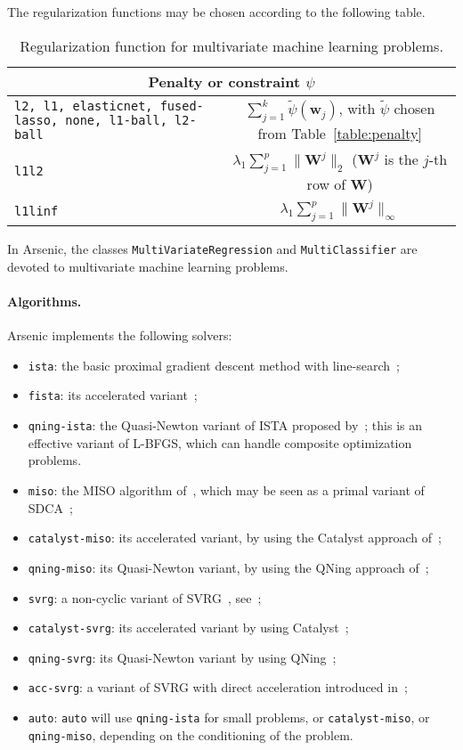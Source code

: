 \documentclass{article}
\def\w{{\mathbf{w}}}
\def\W{{\mathbf{W}}}
\begin{document}
The regularization functions may be chosen according to the following table.
\begin{table}[h!]
   \centering
   \begin{tabular}{|p{5cm}|c|}
      \hline
      \multicolumn{2}{|c|}{Penalty or constraint $\psi$}     \\  
      \hline
      \texttt{l2, l1, elasticnet, fused-lasso, none, l1-ball, l2-ball} & 
      $\sum_{j=1}^k \tilde{\psi}(\w_j)$, with $\tilde{\psi}$ chosen from Table~\ref{table:penalty} \\
      \hline
      \texttt{l1l2} & $\lambda_1 \sum_{j=1}^p \| \W^j\|_2$ ($\W^j$ is the $j$-th row of $\W$) \\ 
      \hline
      \texttt{l1linf} & $\lambda_1 \sum_{j=1}^p \| \W^j\|_\infty$  \\ 
      \hline
   \end{tabular}
   \caption{Regularization function for multivariate machine learning problems.}
\end{table}

In Arsenic, the classes \texttt{MultiVariateRegression} and \texttt{MultiClassifier} are devoted to multivariate machine learning problems.

\paragraph{Algorithms.}
Arsenic implements the following solvers:
\begin{itemize}
   \item \texttt{ista}: the basic proximal gradient descent method with line-search~\citep[see][]{fista};
   \item \texttt{fista}: its accelerated variant~\citep{fista};
   \item \texttt{qning-ista}: the Quasi-Newton variant of ISTA proposed by~\citet{lin2019inexact}; this is an effective variant of L-BFGS, which can handle composite optimization problems.
   \item \texttt{miso}: the MISO algorithm of~\citet{miso}, which may be seen as a primal variant of SDCA~\citep{sdca};
   \item \texttt{catalyst-miso}: its accelerated variant, by using the Catalyst approach of~\citet{lin2018catalyst};
   \item \texttt{qning-miso}: its Quasi-Newton variant, by using the QNing approach of~\citet{lin2019inexact};
   \item \texttt{svrg}: a non-cyclic variant of SVRG~\citep{proxsvrg}, see~\citep{kulunchakov2019estimate};
   \item \texttt{catalyst-svrg}: its accelerated variant by using Catalyst~\citep{lin2018catalyst};
   \item \texttt{qning-svrg}: its Quasi-Newton variant by using QNing~\citep{lin2019inexact};
   \item \texttt{acc-svrg}: a variant of SVRG with direct acceleration introduced in~\citep{kulunchakov2019estimate};
   \item \texttt{auto}: \texttt{auto} will use \texttt{qning-ista} for small problems, or \texttt{catalyst-miso}, or \texttt{qning-miso}, depending on the conditioning of the problem.
\end{itemize}
\end{document}
